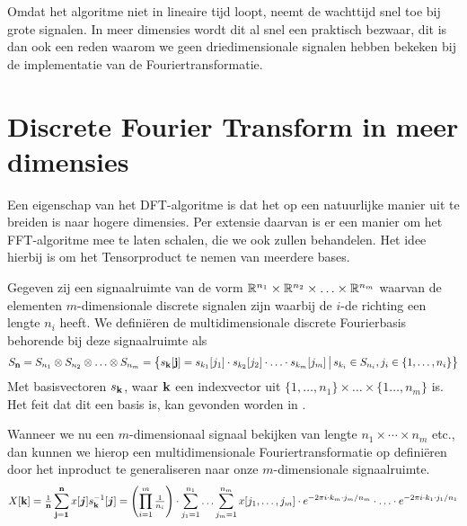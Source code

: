 \begin{opmerking}
Omdat het algoritme niet in lineaire tijd loopt, neemt de wachttijd snel toe bij grote signalen. 
In meer dimensies wordt dit al snel een praktisch bezwaar, dit is dan ook een reden waarom we geen driedimensionale 
signalen hebben bekeken bij de implementatie van de Fouriertransformatie.
\end{opmerking}

\section{Discrete Fourier Transform in meer dimensies}
Een eigenschap van het DFT-algoritme is dat het op een natuurlijke manier uit te breiden is naar hogere dimensies.
Per extensie daarvan is er een manier om het FFT-algoritme mee te laten schalen, die we ook zullen behandelen.
Het idee hierbij is om het Tensorproduct te nemen van meerdere bases.

\begin{definitie} 
Gegeven zij een signaalruimte van de vorm
$\mathbb{R}^{n_1} \times \mathbb{R}^{n_2} \times \ldots \times \mathbb{R}^{n_m}$ 
waarvan de elementen $m$-dimensionale discrete signalen zijn waarbij de $i$-de richting een lengte $n_i$ heeft.
We defini\"eren de multidimensionale discrete Fourierbasis behorende bij deze signaalruimte als
\[
  S_{\bold n}= S_{n_1}\otimes S_{n_2} \otimes \ldots \otimes S_{n_m} = 
  \left\{s_{\bold k}[{\bold j}]  = s_{k_1}[j_1]\cdot s_{k_2}[j_2]\cdot\ldots\cdot s_{k_m}[j_m] 
  \,\big|\, s_{k_i} \in S_{n_i}, j_i \in \{1,\ldots, n_i\} \right\}
\]
Met basisvectoren $s_{\bold k}$, waar $\bold k$ een indexvector uit $\{1, \ldots, n_1\}\times\ldots\times\{1\ldots, n_m\}$ is.
Het feit dat dit een basis is, kan gevonden worden in \cite{topo}.
\end{definitie}

Wanneer we nu een $m$-dimensionaal signaal bekijken van lengte $n_1 \times \cdots \times n_m$ etc., dan kunnen we
hierop een multidimensionale Fouriertransformatie op defini\"eren door het inproduct te generaliseren naar 
onze $m$-dimensionale signaalruimte.
\begin{equation}
  \label{algemeen_fourier_schema}
  X[\bold k] = \tfrac{1}{\bold n}
  \sum_{\bold j = \bold 1}^{\bold n} x[\boldsymbol j] s^{-1}_{\bold k}[\boldsymbol j] 
  =
  \left(\prod_{i=1}^m \tfrac{1}{n_i}\right) \cdot 
  \sum_{j_1=1}^{n_1} \ldots \sum_{j_m=1}^{n_m} 
  x[j_1,\ldots,j_m] \cdot 
  e^{-{2\pi i}\cdot k_m \cdot j_m /n_m } \cdot \ldots \cdot e^{-{2\pi i}\cdot k_1 \cdot j_1 /n_1 } 
\end{equation}

